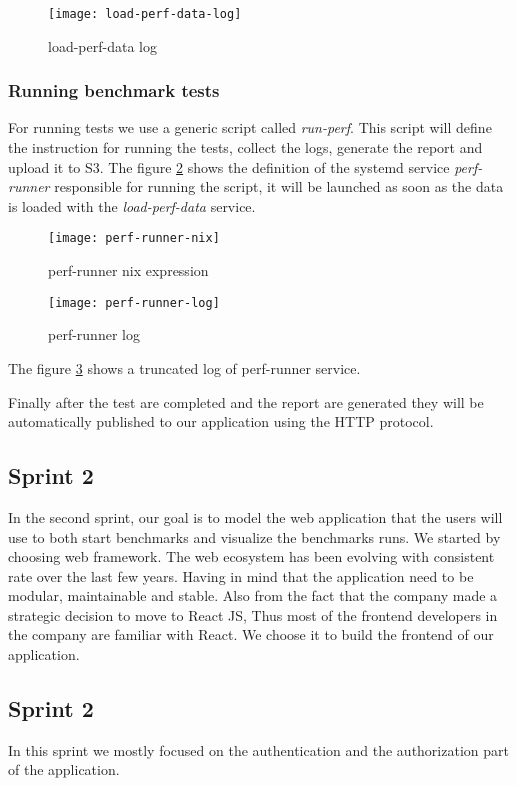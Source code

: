 \begin{figure}[h]
  \centerline{\texttt{[image: load-perf-data-log]}}
\caption{load-perf-data log}
\label{fig:load-perf-data-log}
\end{figure}

\subsubsection{Running benchmark tests}
For running tests we use a generic script called \emph{run-perf}. This script will
define the instruction for running the tests, collect the logs, generate the
report and upload it to S3. The figure
\hyperref[fig:perf-runner-nix]{\ref{fig:perf-runner-nix}} shows the definition of
the systemd service \emph{perf-runner} responsible for running the script, it
will be launched as soon as the data is loaded with the \emph{load-perf-data}
service.
\begin{figure}[h]
  \texttt{[image: perf-runner-nix]}
  \caption{perf-runner nix expression}
\label{fig:perf-runner-nix}
\end{figure}

\begin{figure}[h]
  \texttt{[image: perf-runner-log]}
  \caption{perf-runner log}
\label{fig:perf-runner-log}
\end{figure}
The figure \hyperref[fig:perf-runner-log]{\ref{fig:perf-runner-log}} shows a
truncated log of perf-runner service.

Finally after the test are completed and the report are generated they will be
automatically published to our application using the HTTP protocol.

\subsection{Sprint 2}
In the second sprint, our goal is to model the web application that the users
will use to both start benchmarks and visualize the benchmarks runs. We started
by choosing web framework.
The web ecosystem has been evolving with consistent rate over the last few
years. Having in mind that the application need to be modular, maintainable and
stable. Also from the fact that the company made a strategic decision to move to
React JS, Thus most of the frontend developers in the company are familiar with
React. We choose it to build the frontend of our application.

\subsection{Sprint 2}
In this sprint we mostly focused on the authentication and the authorization part
of the application.
